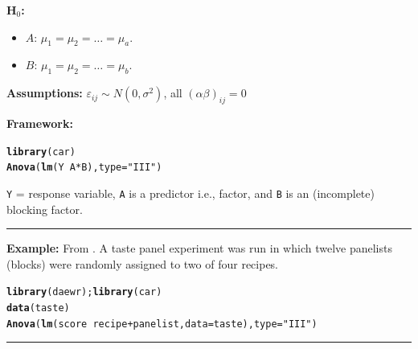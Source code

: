 \documentclass[12pt,english]{article}\usepackage[]{graphicx}\usepackage[table]{xcolor}
\makeatletter
\newcommand{\hlsng}[1]{\textcolor[rgb]{0.192,0.494,0.8}{#1}}%
\newcommand{\hlopt}[1]{\textcolor[rgb]{0,0,0}{#1}}%
\newcommand{\hldef}[1]{\textcolor[rgb]{0.345,0.345,0.345}{#1}}%
\newcommand{\hlkwc}[1]{\textcolor[rgb]{0.333,0.667,0.333}{#1}}%
\newcommand{\hlkwd}[1]{\textcolor[rgb]{0.737,0.353,0.396}{\textbf{#1}}}%
\newenvironment{kframe}{%
 \def\at@end@of@kframe{}%
 \ifinner\ifhmode%
  \def\at@end@of@kframe{\end{minipage}}%
  \begin{minipage}{\columnwidth}%
 \fi\fi%
 \def\FrameCommand##1{\hskip\@totalleftmargin \hskip-\fboxsep
 \colorbox{shadecolor}{##1}\hskip-\fboxsep
     \hskip-\linewidth \hskip-\@totalleftmargin \hskip\columnwidth}%
 \MakeFramed {\advance\hsize-\width
   \@totalleftmargin\z@ \linewidth\hsize
   \@setminipage}}%
 {\par\unskip\endMakeFramed%
 \at@end@of@kframe}
\newenvironment{knitrout}{}{} %
\makeatother
\begin{document}
\noindent \textbf{H$_0$:}
\begin{itemize}
\item $A$: $\mu_1 = \mu_2 = \dots = \mu_a$.
\item $B$: $\mu_1 = \mu_2 = \dots = \mu_b$.
\end{itemize}
\vspace{0.1in}

\noindent \textbf{Assumptions:} $\varepsilon_{ij} \sim N(0, \sigma^2)$, all $(\alpha\beta)_{ij} = 0$
\vspace{0.1in}


\begin{tcolorbox}[colback=yellow!50!red!25!white,colbacktitle=yellow!50!red,colframe=black!75!white,title=\textbf{R:} BIBD]
\textbf{Framework:}\\
\vspace{-.2in}
\begin{knitrout}
\color{fgcolor}\begin{kframe}
\begin{alltt}
\hlkwd{library}\hldef{(car)}
\hlkwd{Anova}\hldef{(}\hlkwd{lm}\hldef{(Y} \hlopt{~} \hldef{A} \hlopt{*} \hldef{B),} \hlkwc{type} \hldef{=} \hlsng{"III"}\hldef{)}
\end{alltt}
\end{kframe}
\end{knitrout}
\texttt{Y} = response variable, \texttt{A} is a predictor i.e., factor, and \texttt{B} is an (incomplete) blocking factor.
\vspace{0.1in}
\par\noindent\rule{.9\textwidth}{0.4pt}


\textbf{Example:} From \citep[][pg 267]{lawson}.  A taste panel experiment was run in which twelve panelists (blocks) were randomly assigned to two of four recipes.
\vspace{-.1in}
\begin{knitrout}
\color{fgcolor}\begin{kframe}
\begin{alltt}
\hlkwd{library}\hldef{(daewr);} \hlkwd{library}\hldef{(car)}
\hlkwd{data}\hldef{(taste)}
\hlkwd{Anova}\hldef{(}\hlkwd{lm}\hldef{(score} \hlopt{~} \hldef{recipe} \hlopt{+} \hldef{panelist,} \hlkwc{data} \hldef{= taste),} \hlkwc{type} \hldef{=} \hlsng{"III"}\hldef{)}
\end{alltt}
\end{kframe}
\end{knitrout}

\end{tcolorbox}
\par\noindent\rule{.9\textwidth}{0.4pt}
\end{document}

